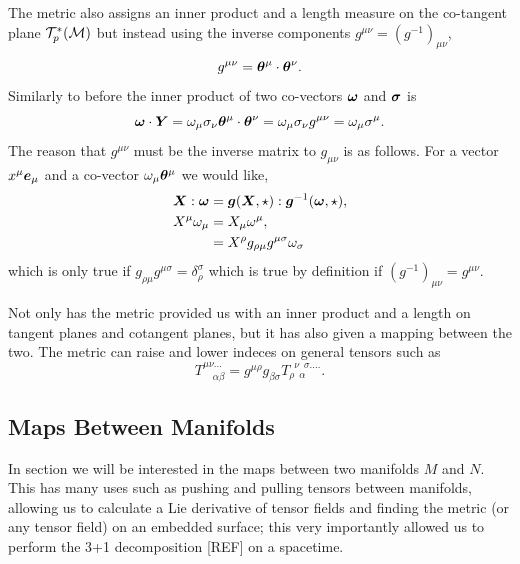 The metric also assigns an inner product and a length measure on the co-tangent plane $\mathcal{T}^*_p(\mathcal{M})$ but instead using the inverse components $g^{\mu\nu} = (g^{-1})_{\mu\nu}$,
\begin{equation}
g^{\mu\nu} = \boldsymbol{\theta}^\mu \cdot \boldsymbol{\theta}^\nu.
\end{equation}
Similarly to before the inner product of two co-vectors $\boldsymbol{\omega}$ and $\boldsymbol{\sigma}$ is
\begin{equation}
\boldsymbol{\omega} \cdot \boldsymbol{Y} = \omega_\mu \sigma_\nu \boldsymbol{\theta}^\mu \cdot \boldsymbol{\theta}^\nu = \omega_\mu \sigma_\nu g^{\mu\nu} = \omega_\mu \sigma^\mu.
\end{equation}
The reason that $g^{\mu\nu}$ must be the inverse matrix to $g_{\mu\nu}$ is as follows. For a vector $x^\mu \boldsymbol{e}_\mu$ and a co-vector $\omega_\mu \boldsymbol{\theta}^\mu$ we would like, 
\begin{align}
\boldsymbol{X} : \boldsymbol{\omega} &= \boldsymbol{g}(\boldsymbol{X},\star) : \boldsymbol{g}^{-1}(\boldsymbol{\omega},\star) ,\\
X^\mu \omega_\mu  &= X_\mu \omega^\mu ,\\
&= X^\rho g_{\rho\mu}g^{\mu\sigma} \omega_\sigma
\end{align}
which is only true if $g_{\rho\mu}g^{\mu\sigma} = \delta^\sigma_\rho$ which is true by definition if $(g^{-1})_{\mu\nu} = g^{\mu\nu}$.

Not only has the metric provided us with an inner product and a length on tangent planes and cotangent planes, but it has also given a mapping between the two. The metric can raise and lower indeces on general tensors such as
\begin{equation}
T^{\mu\nu ...}_{\,\,\,\,\,\, \alpha \beta} = g^{\mu\rho}g_{\beta\sigma}T^{\,\,\, \nu \,\,\, \sigma ....}_{\rho \,\,\, \alpha}.
\end{equation}



\subsection{Maps Between Manifolds}\label{intro:sect:map}
In section we will be interested in the maps between two manifolds $M$ and $N$. This has many uses such as pushing and pulling tensors between manifolds, allowing us to calculate a Lie derivative of tensor fields and finding the metric (or any tensor field) on an embedded surface; this very importantly allowed us to perform the 3+1 decomposition [REF] on a spacetime.


